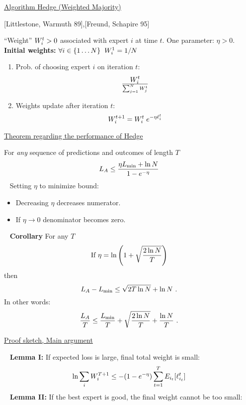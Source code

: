\begin{flushleft}
\begin{LARGE}
\begin{center}
\underline{Algorithm Hedge (Weighted Majority)}
\end{center}
[Littlestone, Warmuth 89],[Freund, Schapire 95]\newline

``Weight'' $W_{i}^{t}>0$ associated with expert $i$ at
time $t$.
\newline\newline
One parameter: $\eta>0$.
\newline\newline
{\bf Initial weights:} $\forall i \in \{1 \ldots N\}\;\;
W_{i}^{1}=1/N$
\begin{enumerate}
\item
Prob. of choosing expert $i$ on iteration $t$:
\[ W_{i}^{t} \over \sum_{j=1}^N W_{j}^{t}\]
\item
{Weights update after iteration $t$:} 
\[ W_{i}^{t+1} = W_{i}^{t}\; e^{-\eta \ell_{i}^{t}} \]
\end{enumerate}
\pagebreak
\begin{center}
\underline{Theorem regarding the performance of Hedge}
\end{center}

For {\em any} sequence of predictions and outcomes of length $T$
\[
L_A \leq {\eta L_{\min}+ \ln N \over 1-e^{-\eta}}
\]
~\newline\newline
Setting $\eta$ to minimize bound:
\begin{itemize}
\item
Decreasing $\eta$ decreases numerator.
\item
If $\eta \to 0$ denominator becomes zero.
\end{itemize}
~\newline\newline
{\bf Corollary}
For any $T$
\[
\mbox{If  } \eta = \ln \left(1+\sqrt{2 \ln N \over T} \right)
\]
then
\[
L_A - L_{\min} \leq \sqrt{2T \ln N} +\ln N~.
\]
In other words:
\[
{L_A \over T} \leq  {L_{\min}\over T} + \sqrt{2\ln N \over T}
+{\ln N \over T}~.
\]
\pagebreak

\begin{center}
\underline{Proof sketch, Main argument}
\end{center}
~\newline
{\bf Lemma I:}
If expected loss is large, final total weight is small:
\[
\ln \sum_i W_{i}^{T+1} 
 \leq - (1-e^{-\eta})
	\sum_{t=1}^T E_{i_t} [\ell_{i_t}^{t}]
\]
~\newline
{\bf Lemma II:}
If the best expert is good, the final weight cannot be too small:


\end{LARGE}
\end{flushleft}
